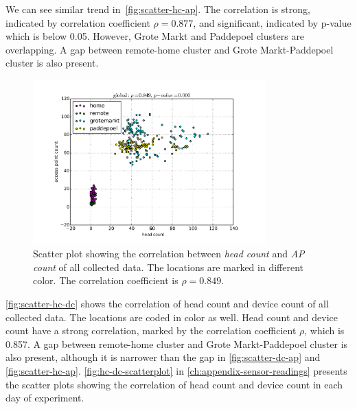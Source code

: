	We can see similar trend in~\autoref{fig:scatter-hc-ap}. The correlation is strong, indicated by correlation coefficient $\rho = 0.877$, and significant, indicated by p-value which is below 0.05. However, Grote Markt and Paddepoel clusters are overlapping. A gap between remote-home cluster and Grote Markt-Paddepoel cluster is also present.

	\begin{figure}[h]
		\centering
		\includegraphics[width=0.8\textwidth]{./img/result/global-gt-vs-ap}
		\caption[Scatter plot showing the correlation of head count and \ac{AP} count.]
		{Scatter plot showing the correlation between \textit{head count} and \textit{\ac{AP} count} of all collected data. The locations are marked in different color. The correlation coefficient is $\rho=0.849$.}
		\label{fig:scatter-hc-ap}
	\end{figure}

	\autoref{fig:scatter-hc-dc} shows the correlation of head count and device count of all collected data. The locations are coded in color as well. Head count and device count have a strong correlation, marked by the correlation coefficient $\rho$, which is 0.857. A gap between remote-home cluster and Grote Markt-Paddepoel cluster is also present, although it is narrower than the gap in \autoref{fig:scatter-dc-ap} and \autoref{fig:scatter-hc-ap}. \autoref{fig:hc-dc-scatterplot} in \autoref{ch:appendix-sensor-readings} presents the scatter plots showing the correlation of head count and device count in each day of experiment.

